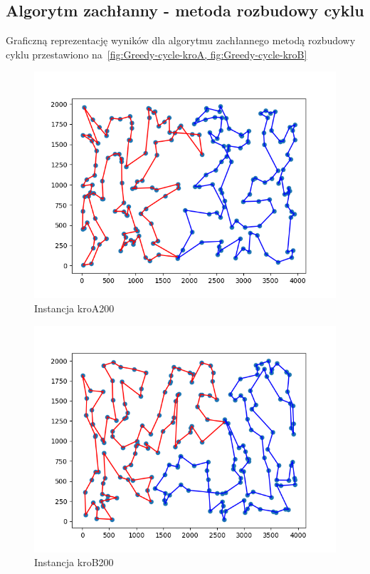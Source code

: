 \documentclass[11pt]{article}
\begin{document}
\subsection{Algorytm zachłanny - metoda rozbudowy cyklu}\label{subsec:algorytm-zachanny---metoda-rozbudowy-cyklu2}

Graficzną reprezentację wyników dla algorytmu zachłannego metodą rozbudowy cyklu przestawiono na~\ref{fig:Greedy-cycle-kroA, fig:Greedy-cycle-kroB}
\begin{figure}[H]
    \centering
    \includegraphics{best_paths/greedy_cheapest_insertion_kroA200.tsp.png}
    \caption{Instancja kroA200}
    \label{fig:Greedy-cycle-kroA}
\end{figure}
\begin{figure}[H]
    \centering
    \includegraphics{best_paths/greedy_cheapest_insertion_kroB200.tsp.png}
    \caption{Instancja kroB200}
    \label{fig:Greedy-cycle-kroB}
\end{figure}
\end{document}
